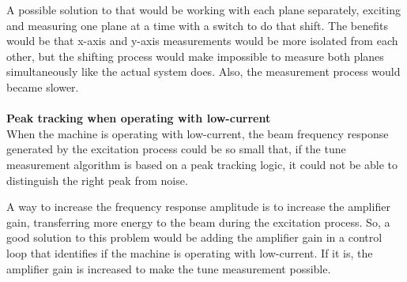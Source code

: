 A possible solution to that would be working with each plane separately, exciting and measuring one plane at a time with a switch to do that shift. The benefits would be that x-axis and y-axis measurements would be more isolated from each other, but the shifting process would make impossible to measure both planes simultaneously like the actual system does. Also, the measurement process would became slower.\\ \\

\noindent
\textbf{Peak tracking when operating with low-current}\\

When the machine is operating with low-current, the beam frequency response generated by the excitation process could be so small that, if the tune measurement algorithm is based on a peak tracking logic, it could not be able to distinguish the right peak from noise.

A way to increase the frequency response amplitude is to increase the amplifier gain, transferring more energy to the beam during the excitation process. So, a good solution to this problem would be adding the amplifier gain in a control loop that identifies if the machine is operating with low-current. If it is, the amplifier gain is increased to make the tune measurement possible.

\pagebreak